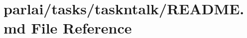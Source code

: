 \hypertarget{parlai_2tasks_2taskntalk_2README_8md}{}\section{parlai/tasks/taskntalk/\+R\+E\+A\+D\+ME.md File Reference}
\label{parlai_2tasks_2taskntalk_2README_8md}
